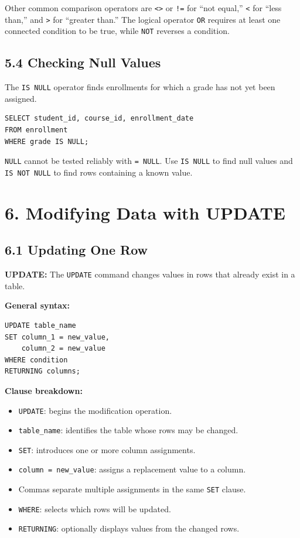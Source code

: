 \documentclass[12pt,a4paper]{article}
\newcommand{\defbox}[2]{%
  \vspace{0.2cm}
  \noindent\colorbox{boxgray}{\parbox{\dimexpr\linewidth-2\fboxsep}{%
    \textbf{#1:} #2
  }}
  \vspace{0.2cm}
}
\begin{document}
\noindent Other common comparison operators are \texttt{<>} or \texttt{!=} for ``not equal,''
\texttt{<} for ``less than,'' and \texttt{>} for ``greater than.'' The logical operator
\texttt{OR} requires at least one connected condition to be true, while \texttt{NOT} reverses a
condition.

\subsection*{5.4 Checking Null Values}
The \texttt{IS NULL} operator finds enrollments for which a grade has not yet been assigned.

\begin{verbatim}
SELECT student_id, course_id, enrollment_date
FROM enrollment
WHERE grade IS NULL;
\end{verbatim}

\noindent \texttt{NULL} cannot be tested reliably with \texttt{= NULL}. Use
\texttt{IS NULL} to find null values and \texttt{IS NOT NULL} to find rows containing a known value.

\section*{6. Modifying Data with UPDATE}

\subsection*{6.1 Updating One Row}
\defbox{UPDATE}{The \texttt{UPDATE} command changes values in rows that already exist in a table.}

\noindent\textbf{General syntax:}
\begin{verbatim}
UPDATE table_name
SET column_1 = new_value,
    column_2 = new_value
WHERE condition
RETURNING columns;
\end{verbatim}

\noindent\textbf{Clause breakdown:}
\begin{itemize}
    \item \texttt{UPDATE}: begins the modification operation.
    \item \texttt{table\_name}: identifies the table whose rows may be changed.
    \item \texttt{SET}: introduces one or more column assignments.
    \item \texttt{column = new\_value}: assigns a replacement value to a column.
    \item Commas separate multiple assignments in the same \texttt{SET} clause.
    \item \texttt{WHERE}: selects which rows will be updated.
    \item \texttt{RETURNING}: optionally displays values from the changed rows.
\end{itemize}
\end{document}
